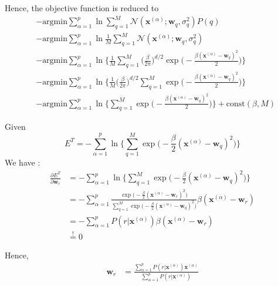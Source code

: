 Hence, the objective function is reduced to 
\begin{align*}
& - \text{argmin}\sum_{\alpha=1}^{p} \ln \sum_{q=1}^{M} \mathcal{N}(\boldsymbol{x}^{(\alpha)}; \boldsymbol{w}_q, \sigma_q^2) P(q) \\
	& - \text{argmin} \sum_{\alpha=1}^{p} \ln \frac{1}{M}  \sum_{q=1}^{M} \mathcal{N}(\boldsymbol{x}^{(\alpha)}; \boldsymbol{w}_q, \sigma_q^2) \\
	&- \text{argmin} \sum_{\alpha=1}^{p} \ln  \Bigg \{  \frac{1}{M} \sum_{q=1}^{M} \bigg( \frac{\beta}{2\pi} \bigg)^{d/2}\exp{ \bigg( - \frac{\beta (\boldsymbol{x}^{(\alpha)}-\boldsymbol{w}_q)^2}{2} \bigg) }  \Bigg \} \\
		&- \text{argmin} \sum_{\alpha=1}^{p} \ln  \Bigg \{  \frac{1}{M} \bigg( \frac{\beta}{2\pi} \bigg)^{d/2}  \sum_{q=1}^{M} \exp{ \bigg( - \frac{\beta (\boldsymbol{x}^{(\alpha)}-\boldsymbol{w}_q)^2}{2} \bigg) }  \Bigg \} \\
		&- \text{argmin} \sum_{\alpha=1}^{p} \ln \Bigg \{ \sum_{q=1}^{M} \exp{ \bigg( - \frac{\beta (\boldsymbol{x}^{(\alpha)}-\boldsymbol{w}_q)^2}{2} \bigg) } \Bigg\} + \text{const}(\beta, M)
\end{align*}

Given $$E^T = - \sum_{\alpha=1}^{p} \ln \Bigg \{ \sum_{q=1}^{M} \exp{ \bigg( - \frac{\beta}{2} (\boldsymbol{x}^{(\alpha)}-\boldsymbol{w}_q)^2 \bigg) } \Bigg\}$$
We have : 
\begin{align*}
	\frac{\partial E^T}{\partial \boldsymbol{w}_r} &= - \sum_{\alpha=1}^{p} \ln \Bigg \{ \sum_{q=1}^{M} \exp{ \bigg( - \frac{\beta}{2} (\boldsymbol{x}^{(\alpha)}-\boldsymbol{w}_q)^2 \bigg) } \Bigg\} \\
	&=  - \sum_{\alpha=1}^{p}   \frac{ \exp{ \bigg( - \frac{\beta}{2} (\boldsymbol{x}^{(\alpha)}-\boldsymbol{w}_r)^2 \bigg) } }{ \sum_{q=1}^{M} \exp{ \bigg( - \frac{\beta}{2} (\boldsymbol{x}^{(\alpha)}-\boldsymbol{w}_q)^2 \bigg) } } \beta(\boldsymbol{x}^{(\alpha)}-\boldsymbol{w}_r) \\
	&=  - \sum_{\alpha=1}^{p}   P(r| \boldsymbol{x}^{(\alpha)} ) \beta(\boldsymbol{x}^{(\alpha)}-\boldsymbol{w}_r) \\
	&\stackrel{!}{=} 0 
\end{align*}

Hence,
\begin{align*}
	\boldsymbol{w}_r &= \frac{ \sum_{\alpha=1}^{p}   P(r| \boldsymbol{x}^{(\alpha)} ) \boldsymbol{x}^{(\alpha)}}{ \sum_{\alpha=1}^{p}   P(r| \boldsymbol{x}^{(\alpha)} ) }  \\
\end{align*}

